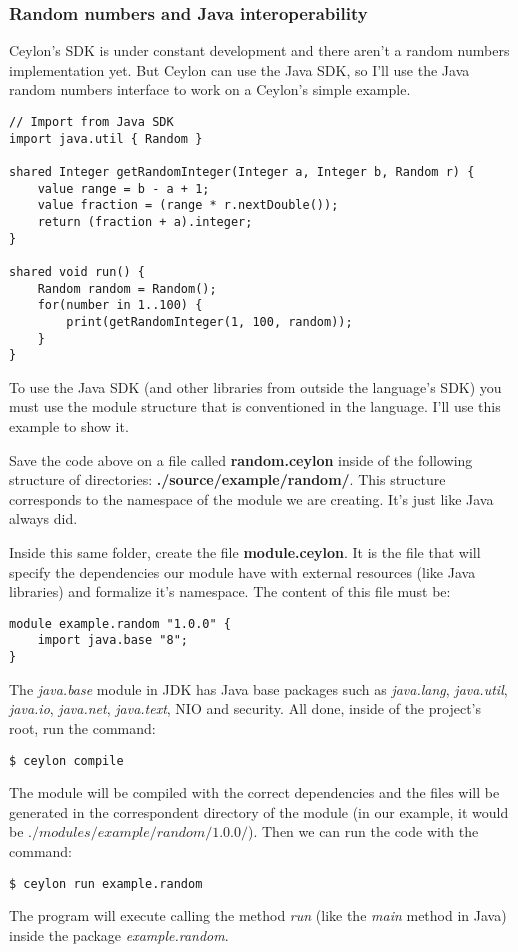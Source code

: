\subsubsection{Random numbers and Java interoperability}

Ceylon's SDK is under constant development\cite{1_8} and there aren't a random
numbers implementation yet. But Ceylon can use the Java SDK, so I'll use the
Java random numbers interface to work on a Ceylon's simple example.

\begin{lstlisting}[label=w1,caption=Random number from Java]
// Import from Java SDK
import java.util { Random }

shared Integer getRandomInteger(Integer a, Integer b, Random r) {
	value range = b - a + 1;
	value fraction = (range * r.nextDouble());
	return (fraction + a).integer;
}

shared void run() {
    Random random = Random();
    for(number in 1..100) {
        print(getRandomInteger(1, 100, random));
    }
}
\end{lstlisting}

To use the Java SDK (and other libraries from outside the language's SDK) you
must use the module structure that is conventioned in the language. I'll use
this example to show it.

Save the code above on a file called \textbf{random.ceylon} inside of the
following structure of directories: \textbf{./source/example/random/}. This
structure corresponds to the namespace of the module we are creating. It's just
like Java always did.

Inside this same folder, create the file \textbf{module.ceylon}. It is the file
that will specify the dependencies our module have with external resources (like
Java libraries) and formalize it's namespace. The content of this file must be:

\begin{lstlisting}
module example.random "1.0.0" {
    import java.base "8";
}
\end{lstlisting}

The \textit{java.base} module in JDK has Java base packages such as
\textit{java.lang}, \textit{java.util}, \textit{java.io}, \textit{java.net},
\textit {java.text}, NIO and security\cite{1_9}. All done, inside of the
project's root, run the command:

\begin{verbatim}
$ ceylon compile
\end{verbatim}

The module will be compiled with the correct dependencies and the files will be
generated in the correspondent directory of the module (in our example, it
would be $./modules/example/random/1.0.0/$). Then we can run the code
with the command:

\begin{verbatim}
$ ceylon run example.random
\end{verbatim}

The program will execute calling the method \textit{run} (like the \textit{main}
method in Java) inside the package \textit{example.random}.

